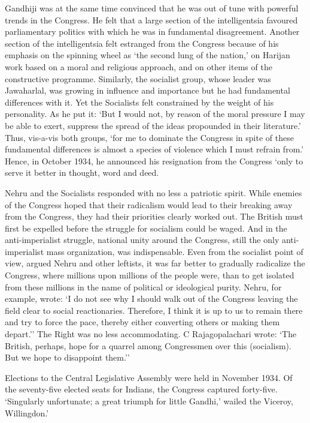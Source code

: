 \begin{multicols}{2}
Gandhiji was at the same time convinced that he was out of tune with powerful trends in the Congress. He felt that a large section of the intelligentsia favoured parliamentary politics with which he was in fundamental disagreement. Another section of the intelligentsia felt estranged from the Congress because of his emphasis on the spinning wheel as `the second lung of the nation,' on Harijan work based on a moral and religious approach, and on other items of the constructive programme. Similarly, the socialist group, whose leader was Jawaharlal, was growing in influence and importance but he had fundamental differences with it. Yet the Socialists felt constrained by the weight of his personality. As he put it: `But I would not, by reason of the moral pressure I may be able to exert, suppress the spread of the ideas propounded in their literature.' Thus, vis-a-vis both groups, `for me to dominate the Congress in spite of these fundamental differences is almost a species of violence which I must refrain from.' Hence, in October 1934, he announced his resignation from the Congress `only to serve it better in thought, word and deed. 

Nehru and the Socialists responded with no less a patriotic spirit. While enemies of the Congress hoped that their radicalism would lead to their breaking away from the Congress, they had their priorities clearly worked out. The British must first be expelled before the struggle for socialism could be waged. And in the anti-imperialist struggle, national unity around the Congress, still the only anti-imperialist mass organization, was indispensable. Even from the socialist point of view, argued Nehru and other leftists, it was far better to gradually radicalize the Congress, where millions upon millions of the people were, than to get isolated from these millions in the name of political or ideological purity. Nehru, for example, wrote: `I do not see why I should walk out of the Congress leaving the field clear to social reactionaries. Therefore, I think it is up to us to remain there and try to force the pace, thereby either converting others or making them depart.'' The Right was no less accommodating. C Rajagopalachari wrote: `The British, perhaps, hope for a quarrel among Congressmen over this (socialism). But we hope to disappoint them.'' 

Elections to the Central Legislative Assembly were held in November 1934. Of the seventy-five elected seats for Indians, the Congress captured forty-five. `Singularly unfortunate; a great triumph for little Gandhi,' wailed the Viceroy, Willingdon.'


\end{multicols}
